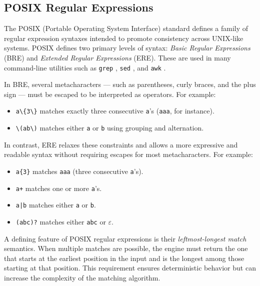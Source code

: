 \subsection{POSIX Regular Expressions}

The POSIX (Portable Operating System Interface) standard defines a family of regular expression syntaxes intended to promote consistency across UNIX-like systems. POSIX defines two primary levels of syntax: \textit{Basic Regular Expressions} (BRE) and \textit{Extended Regular Expressions} (ERE). These are used in many command-line utilities such as \texttt{grep} \cite{sw_grep}, \texttt{sed} \cite{sw_sed}, and \texttt{awk} \cite{sw_gawk}.

In BRE, several metacharacters — such as parentheses, curly braces, and the plus sign — must be escaped to be interpreted as operators. For example:
\begin{itemize}
	\item \texttt{a\textbackslash\{3\textbackslash\}} matches exactly three consecutive \texttt{a}'s (\texttt{aaa}, for instance).
	\item \texttt{\textbackslash(a\textbar b\textbackslash)} matches either \texttt{a} or \texttt{b} using grouping and alternation.
\end{itemize}

In contrast, ERE relaxes these constraints and allows a more expressive and readable syntax without requiring escapes for most metacharacters. For example:
\begin{itemize}
	\item \texttt{a\{3\}} matches \texttt{aaa} (three consecutive \texttt{a}'s).
	\item \texttt{a+} matches one or more \texttt{a}'s.
	\item \texttt{a|b} matches either \texttt{a} or \texttt{b}.
	\item \texttt{(abc)?} matches either \texttt{abc} or $\varepsilon$.
\end{itemize}

A defining feature of POSIX regular expressions is their \textit{leftmost-longest match} semantics. When multiple matches are possible, the engine must return the one that starts at the earliest position in the input and is the longest among those starting at that position. This requirement ensures deterministic behavior but can increase the complexity of the matching algorithm. \cite{regex_opengroup}


